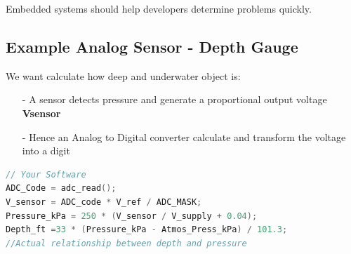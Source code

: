 Embedded systems should help developers determine problems quickly.


\subsection{Example Analog Sensor - Depth Gauge}

We want calculate how deep and underwater object is: 


\begin{itemize}
    \item[-] A sensor detects pressure and generate a proportional output voltage \textbf{Vsensor}
    \item[-] Hence an Analog to Digital converter calculate and transform the voltage into a digit 
\end{itemize}

\begin{lstlisting}[language=c++]
// Your Software
ADC_Code = adc_read();
V_sensor = ADC_code * V_ref / ADC_MASK;
Pressure_kPa = 250 * (V_sensor / V_supply + 0.04);
Depth_ft =33 * (Pressure_kPa - Atmos_Press_kPa) / 101.3;
//Actual relationship between depth and pressure
\end{lstlisting}


